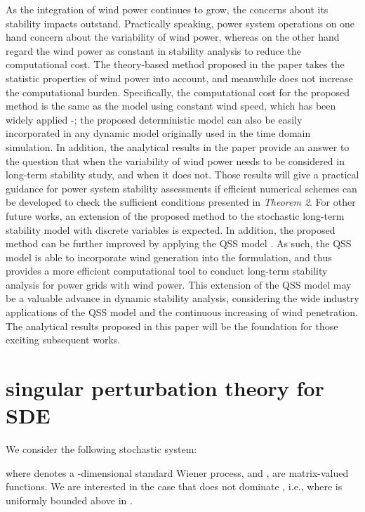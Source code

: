 \documentclass[journal]{IEEEtran}
\begin{document}
As the integration of wind power continues to grow, the concerns about its stability impacts outstand. Practically speaking, power system operations on one hand concern about the variability of wind power, whereas on the other hand regard the wind power as constant in stability analysis to reduce the computational cost. The theory-based method proposed in the paper takes the statistic properties of wind power into account, and meanwhile does not increase the computational burden. Specifically, the computational cost for the proposed method is the same as the model using constant wind speed, which has been widely applied \cite{Vieira:2015}-\cite{Loparo:2011}; the proposed deterministic model can also be easily incorporated in any dynamic model originally used in the time domain simulation. In addition, the analytical results in the paper provide an answer to the question that when the variability of wind power needs to be considered in long-term stability study, and when it does not. Those results will give a practical guidance for power system stability assessments if efficient numerical schemes can be developed to check the sufficient conditions presented in \textit{Theorem 2}. For other future works, an extension of the proposed method to the stochastic long-term stability model with discrete variables is expected. In addition, the proposed method can be further improved by applying the QSS model \cite{Cutsem:book}\cite{Cutsem:article2000}. As such, the QSS model is able to incorporate wind generation into the formulation, and thus provides a more efficient computational tool to conduct long-term stability analysis for power grids with wind power.
This extension of the QSS model may be a valuable advance in dynamic stability analysis, considering the wide industry applications of the QSS model and the continuous increasing of wind penetration. The analytical results proposed in this paper will be the foundation for those exciting subsequent works.







\appendices
\section{singular perturbation theory for SDE}\label{appendix1}
We consider the following stochastic system:

where  denotes a -dimensional standard Wiener process, and ,  are matrix-valued functions. We are interested in the case that  does not dominate , i.e.,  where  is uniformly bounded above in .
\end{document}

